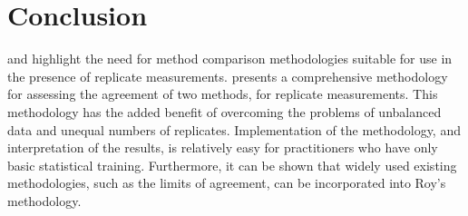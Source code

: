 \documentclass[12pt, a4paper]{report}
\theoremstyle{plain}
\theoremstyle{definition}
\theoremstyle{remark}
\begin{document}
		
		
		




	\section{Conclusion}
	\citet{BXC2008} and \citet{ARoy2009} highlight the need for method comparison methodologies suitable for use in the presence of replicate measurements. \citet{ARoy2009} presents a comprehensive methodology for assessing the agreement of two methods, for replicate measurements. This methodology has the added benefit of overcoming the problems of unbalanced data and unequal numbers of replicates. Implementation of the methodology, and interpretation of the results, is relatively easy for practitioners who have only basic statistical training. Furthermore, it can be shown that widely used existing methodologies, such as the limits of agreement, can be incorporated into Roy's methodology.




\end{document}
